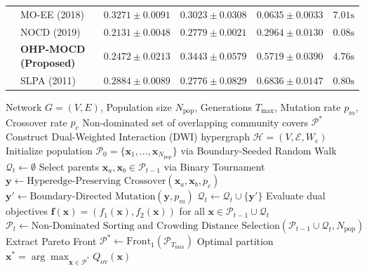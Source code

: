 \documentclass{llncs}
\begin{document}
\begin{table}[t]
{\begin{tabular}{@{}llcccc@{}}
 & MO-EE (2018) & $\mathbf{0.3271 \pm 0.0091}$ & $0.3023 \pm 0.0308$ & $0.0635 \pm 0.0033$ & $7.01\text{s}$ \\
 & NOCD (2019) & $0.2131 \pm 0.0048$ & $0.2779 \pm 0.0021$ & $0.2964 \pm 0.0130$ & $0.08\text{s}$ \\
 & \textbf{OHP-MOCD (Proposed)} & $0.2472 \pm 0.0213$ & $0.3443 \pm 0.0579$ & $0.5719 \pm 0.0390$ & $4.76\text{s}$ \\
 & SLPA (2011) & $0.2884 \pm 0.0089$ & $0.2776 \pm 0.0829$ & $\mathbf{0.6836 \pm 0.0147}$ & $0.80\text{s}$ \\
\bottomrule
\end{tabular}%
}
\end{table}

\begin{algorithm}[t]
\caption{OHP-MOCD: Overlapping Hypergraph Pareto MOEA}\label{alg:ohpmocd}
\begin{algorithmic}[1]
\Require Network $G = (V, E)$, Population size $N_{\text{pop}}$, Generations $T_{\text{max}}$, Mutation rate $p_m$, Crossover rate $p_c$
\Ensure Non-dominated set of overlapping community covers $\mathcal{P}^*$
\State Construct Dual-Weighted Interaction (DWI) hypergraph $\mathcal{H} = (V, \mathcal{E}, W_e)$
\State Initialize population $\mathcal{P}_0 = \{\mathbf{x}_1, \dots, \mathbf{x}_{N_{\text{pop}}}\}$ via Boundary-Seeded Random Walk
    \State $\mathcal{Q}_t \gets \emptyset$
        \State Select parents $\mathbf{x}_a, \mathbf{x}_b \in \mathcal{P}_{t-1}$ via Binary Tournament
        \State $\mathbf{y} \gets \text{Hyperedge-Preserving Crossover}(\mathbf{x}_a, \mathbf{x}_b, p_c)$
        \State $\mathbf{y}' \gets \text{Boundary-Directed Mutation}(\mathbf{y}, p_m)$
        \State $\mathcal{Q}_t \gets \mathcal{Q}_t \cup \{\mathbf{y}'\}$
    \EndWhile
    \State Evaluate dual objectives $\mathbf{f}(\mathbf{x}) = (f_1(\mathbf{x}), f_2(\mathbf{x}))$ for all $\mathbf{x} \in \mathcal{P}_{t-1} \cup \mathcal{Q}_t$
    \State $\mathcal{P}_t \gets \text{Non-Dominated Sorting and Crowding Distance Selection}(\mathcal{P}_{t-1} \cup \mathcal{Q}_t, N_{\text{pop}})$
\EndFor
\State Extract Pareto Front $\mathcal{P}^* \gets \text{Front}_1(\mathcal{P}_{T_{\text{max}}})$
\State \Return Optimal partition $\mathbf{x}^* = \arg\max_{\mathbf{x} \in \mathcal{P}^*} Q_{\text{ov}}(\mathbf{x})$
\end{algorithmic}
\end{algorithm}
\end{document}
